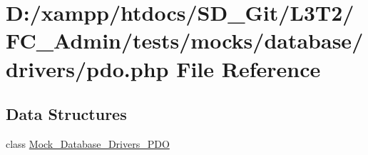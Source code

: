 \hypertarget{_admin_2tests_2mocks_2database_2drivers_2pdo_8php}{}\section{D\+:/xampp/htdocs/\+S\+D\+\_\+\+Git/\+L3\+T2/\+F\+C\+\_\+\+Admin/tests/mocks/database/drivers/pdo.php File Reference}
\label{_admin_2tests_2mocks_2database_2drivers_2pdo_8php}
\subsection*{Data Structures}
\begin{DoxyCompactItemize}
\item 
class \hyperlink{class_mock___database___drivers___p_d_o}{Mock\+\_\+\+Database\+\_\+\+Drivers\+\_\+\+P\+D\+O}
\end{DoxyCompactItemize}
